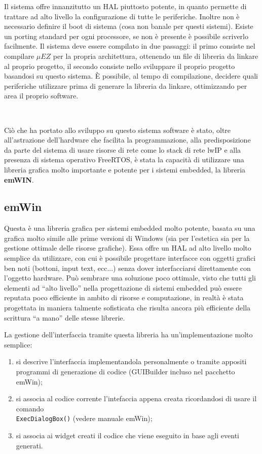 \documentclass[a4paper,titlepage]{book}
\begin{document}
Il sistema offre innanzitutto un HAL piuttosto potente, in quanto permette di trattare ad alto livello la configurazione di tutte le periferiche. Inoltre non è necessario definire il boot di sistema (cosa non banale per questi sistemi). Esiste un porting standard per ogni processore, se non è presente è possibile scriverlo facilmente. Il sistema deve essere compilato in due passaggi: il primo consiste nel compilare $\mu EZ$ per la propria architettura, ottenendo un file di libreria da linkare al proprio progetto, il secondo consiste nello sviluppare il proprio progetto basandosi su questo sistema. È possibile, al tempo di compilazione, decidere quali periferiche utilizzare prima di generare la libreria da linkare, ottimizzando per area il proprio software.

~

Ciò che ha portato allo sviluppo su questo sistema software è stato, oltre all'astrazione dell'hardware che facilita la programmazione, alla predisposizione da parte del sistema di usare risorse di rete come lo stack di rete lwIP e alla presenza di sistema operativo FreeRTOS, è stata la capacità di utilizzare una libreria grafica molto importante e potente per i sistemi embedded, la libreria \textbf{emWIN}.

\subsection{emWin}

Questa è una libreria grafica per sistemi embedded molto potente, basata su una grafica molto simile alle prime versioni di Windows (sia per l'estetica sia per la gestione ottimale delle risorse grafiche). Essa offre un HAL ad alto livello molto semplice da utilizzare, con cui è possibile progettare interfacce con oggetti grafici ben noti (bottoni, input text, ecc...) senza dover interfacciarsi direttamente con l'oggetto hardware. Può sembrare una soluzione poco ottimale, visto che tutti gli elementi ad ``alto livello'' nella progettazione di sistemi embedded può essere reputata poco efficiente in ambito di risorse e computazione, in realtà è stata progettata in maniera talmente sofisticata che risulta ancora più efficiente della scrittura ``a mano'' delle stesse librerie.

La gestione dell'interfaccia tramite questa libreria ha un'implementazione molto semplice:

\begin{enumerate}[noitemsep,topsep=18pt,parsep=10pt,partopsep=0pt]
\item si descrive l'interfaccia implementandola personalmente o tramite appositi programmi di generazione di codice (GUIBuilder incluso nel pacchetto emWin);
\item si associa al codice corrente l'intefaccia appena creata ricordandosi di usare il comando \\\lstinline!ExecDialogBox()! (vedere manuale emWin);
\item si associa ai widget creati il codice che viene eseguito in base agli eventi generati.

\end{enumerate}
\end{document}

